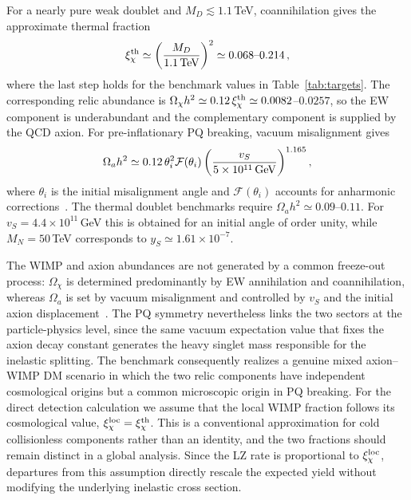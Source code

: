 \documentclass[aps,prd,reprint,preprintnumbers,superscriptaddress,nofootinbib,floatfix]{revtex4-2}
\begin{document}
For a nearly pure weak doublet and $M_D\lesssim1.1$\,TeV, coannihilation gives the approximate thermal fraction~\cite{Cirelli:2005uq,Nagata:2014wma}
\begin{equation}
    \label{eq:thermal}
    \xi_\chi^{\rm th}\simeq\left(\frac{M_D}{1.1{\rm\,TeV}}\right)^2
    \simeq0.068\text{--}0.214\,,
\end{equation}
where the last step holds for the benchmark values in Table~\ref{tab:targets}. The corresponding relic abundance is $\Omega_\chi h^2\simeq0.12\,\xi_\chi^{\rm th}\simeq0.0082$--$0.0257$, so the EW component is underabundant and the complementary component is supplied by the QCD axion. For pre-inflationary PQ breaking, vacuum misalignment gives~\cite{Preskill:1982cy,Abbott:1982af,Dine:1982ah,Borsanyi:2016ksw}
\begin{equation}
    \Omega_a h^2\simeq0.12\,\theta_i^2\mathcal F(\theta_i)
    \left(\frac{v_S}{5\times10^{11}{\rm\,GeV}}\right)^{1.165},
    \label{eq:misalignment}
\end{equation}
where $\theta_i$ is the initial misalignment angle and $\mathcal F(\theta_i)$ accounts for anharmonic corrections~\cite{Visinelli:2009zm}. The thermal doublet benchmarks require $\Omega_a h^2\simeq0.09$--$0.11$. For $v_S=4.4\times10^{11}$\,GeV this is obtained for an initial angle of order unity, while $M_N=50$\,TeV corresponds to $y_S\simeq1.61\times10^{-7}$.

The WIMP and axion abundances are not generated by a common freeze-out process: $\Omega_\chi$ is determined predominantly by EW annihilation and coannihilation, whereas $\Omega_a$ is set by vacuum misalignment and controlled by $v_S$ and the initial axion displacement~\cite{Arias:2012az, Marsh:2015xka}. The PQ symmetry nevertheless links the two sectors at the particle-physics level, since the same vacuum expectation value that fixes the axion decay constant generates the heavy singlet mass responsible for the inelastic splitting. The benchmark consequently realizes a genuine mixed axion--WIMP DM scenario in which the two relic components have independent cosmological origins but a common microscopic origin in PQ breaking. For the direct detection calculation we assume that the local WIMP fraction follows its cosmological value, $\xi_\chi^{\rm loc}=\xi_\chi^{\rm th}$. This is a conventional approximation for cold collisionless components rather than an identity, and the two fractions should remain distinct in a global analysis. Since the LZ rate is proportional to $\xi_\chi^{\rm loc}$, departures from this assumption directly rescale the expected yield without modifying the underlying inelastic cross section.
\end{document}
